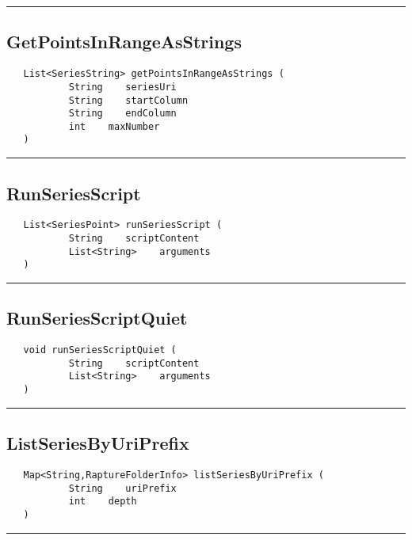 \rule{15cm}{2pt}
\subsection{GetPointsInRangeAsStrings}
\label{Api:GetPointsInRangeAsStrings}
\begin{verbatim}
   List<SeriesString> getPointsInRangeAsStrings (
           String    seriesUri
           String    startColumn
           String    endColumn
           int    maxNumber
   )
\end{verbatim}



\rule{15cm}{2pt}
\subsection{RunSeriesScript}
\label{Api:RunSeriesScript}
\begin{verbatim}
   List<SeriesPoint> runSeriesScript (
           String    scriptContent
           List<String>    arguments
   )
\end{verbatim}



\rule{15cm}{2pt}
\subsection{RunSeriesScriptQuiet}
\label{Api:RunSeriesScriptQuiet}
\begin{verbatim}
   void runSeriesScriptQuiet (
           String    scriptContent
           List<String>    arguments
   )
\end{verbatim}



\rule{15cm}{2pt}
\subsection{ListSeriesByUriPrefix}
\label{Api:ListSeriesByUriPrefix}
\begin{verbatim}
   Map<String,RaptureFolderInfo> listSeriesByUriPrefix (
           String    uriPrefix
           int    depth
   )
\end{verbatim}



\rule{15cm}{2pt}
